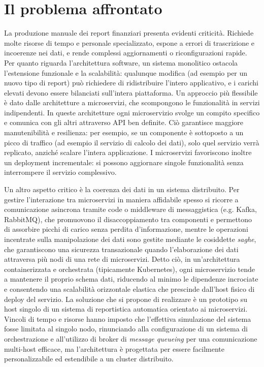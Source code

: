 \section{Il problema affrontato}
La produzione manuale dei report finanziari presenta evidenti criticità. Richiede molte risorse di tempo e personale specializzato, espone a errori di trascrizione e incoerenze nei dati, e rende complessi aggiornamenti o riconfigurazioni rapide. Per quanto riguarda l’architettura software, un sistema monolitico ostacola l’estensione funzionale e la scalabilità: qualunque modifica (ad esempio per un nuovo tipo di report) può richiedere di ridistribuire l’intero applicativo, e i carichi elevati devono essere bilanciati sull’intera piattaforma. Un approccio più flessibile è dato dalle architetture a microservizi, che scompongono le funzionalità in servizi indipendenti. In queste architetture ogni microservizio svolge un compito specifico e comunica con gli altri attraverso API ben definite. Ciò garantisce maggiore manutenibilità e resilienza: per esempio, se un componente è sottoposto a un picco di traffico (ad esempio il servizio di calcolo dei dati), solo quel servizio verrà replicato, anziché scalare l’intera applicazione. I microservizi favoriscono inoltre un deployment incrementale: si possono aggiornare singole funzionalità senza interrompere il servizio complessivo.

Un altro aspetto critico è la coerenza dei dati in un sistema distribuito. Per gestire l’interazione tra microservizi in maniera affidabile spesso si ricorre a comunicazione asincrona tramite code o middleware di messaggistica (e.g. Kafka, RabbitMQ), che promuovono il disaccoppiamento tra componenti e permettono di assorbire picchi di carico senza perdita d'informazione, mentre le operazioni incentrate sulla manipolazione dei dati sono gestite mediante le cosiddette \emph{saghe}, che garantiscono una sicurezza transazionale quando l'elaborazione dei dati attraversa più nodi di una rete di microservizi. Detto ciò, in un’architettura containerizzata e orchestrata (tipicamente Kubernetes), ogni microservizio tende a mantenere il proprio schema dati, riducendo al minimo le dipendenze incrociate e consentendo una scalabilità orizzontale elastica che prescinde dall'host fisico di deploy del servizio.
La soluzione che si propone di realizzare è un prototipo su host singolo di un sistema di reportistica automatica orientato ai microservizi. Vincoli di tempo e risorse hanno imposto che l'effettiva simulazione del sistema fosse limitata al singolo nodo, rinunciando alla configurazione di un sistema di orchestrazione e all'utilizzo di broker di \emph{message queueing} per una comunicazione multi-host efficace, ma l'architettura è progettata per essere facilmente personalizzabile ed estendibile a un cluster distribuito.

